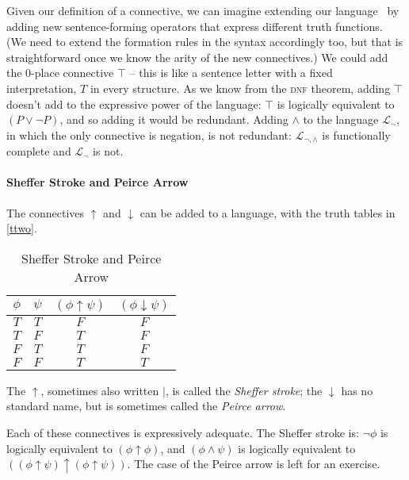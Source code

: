Given our definition of a connective, we can imagine extending our language \lone\ by adding new sentence-forming operators that express different truth functions.  (We need to extend the formation rules in the syntax accordingly too, but that is straightforward once we know the arity of the new connectives.)  We could add the $0$-place connective $\top$ – this is like a sentence letter with a fixed interpretation, $T$ in every structure. As we know from the \textsc{\lowercase{DNF}} theorem, adding $\top$ doesn't add to the expressive power of the language: $\top$ is logically equivalent to $(P \vee \neg P)$, and so adding it would be redundant.  Adding $\wedge$ to the language $\mathcal{L}_{\neg}$, in which the only connective is negation, is not redundant: $\mathcal{L}_{\neg,\wedge}$ is functionally complete and $\mathcal{L}_{\neg}$ is not. 

\paragraph{Sheffer Stroke and Peirce Arrow}

The connectives $\uparrow$ and $\downarrow$ can be added to a language, with the truth tables in \autoref{ttwo}. 
\begin{table}
\centering
\begin{tabular}{cc|cc}
\toprule
	$\phi$ & $\psi$ & $(\phi \uparrow \psi)$ & $(\phi \downarrow \psi)$\\
	\midrule
	$T$ & $T$ & $F$ & $F$\\
	$T$ & $F$ & $T$ & $F$\\
	$F$ & $T$ & $T$ & $F$\\
	$F$ & $F$ & $T$ & $T$\\	
	\bottomrule
\end{tabular}	\caption{Sheffer Stroke and Peirce Arrow\label{ttwo}}
\end{table}The $\uparrow$, sometimes also written $|$, is called the \emph{Sheffer stroke}; the $\downarrow$ has no standard name, but is sometimes called the \emph{Peirce arrow}. 

Each of these connectives is expressively adequate. The  Sheffer stroke is: $\neg \phi$ is logically equivalent to $(\phi\uparrow\phi)$, and $(\phi \wedge \psi)$ is logically equivalent to  $((\phi\uparrow\psi)\uparrow(\phi\uparrow\psi))$. The case of the Peirce arrow is left for an exercise.

